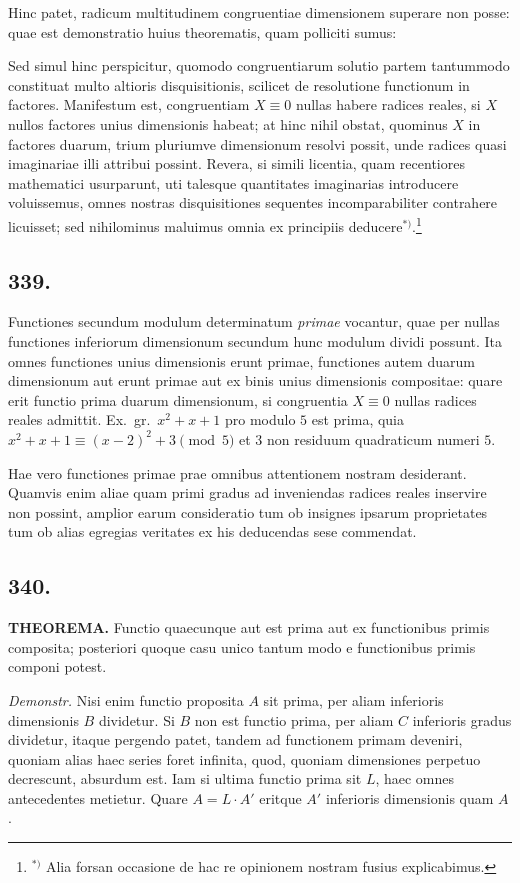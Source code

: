 \documentclass[12pt]{article}
\begin{document}
Hinc patet, radicum multitudinem congruentiae dimensionem superare non posse: quae est demonstratio huius theorematis, quam polliciti sumus:

Sed simul hinc perspicitur, quomodo congruentiarum solutio partem tantummodo constituat multo altioris disquisitionis, scilicet de resolutione functionum in factores. Manifestum est, congruentiam $X\equiv 0$ nullas habere radices reales, si $X$ nullos factores unius dimensionis habeat; at hinc nihil obstat, quominus $X$ in factores duarum, trium pluriumve dimensionum resolvi possit, unde radices quasi imaginariae illi attribui possint. Revera, si simili licentia, quam recentiores mathematici usurparunt, uti talesque quantitates imaginarias introducere voluissemus, omnes nostras disquisitiones sequentes incomparabiliter contrahere licuisset; sed nihilominus maluimus omnia ex principiis deducere$^{*)}$.\footnote{$^{*)}$ Alia forsan occasione de hac re opinionem nostram fusius explicabimus.}

\subsection*{339.}

Functiones secundum modulum determinatum \textit{primae} vocantur, quae per nullas functiones inferiorum dimensionum secundum hunc modulum dividi possunt. Ita omnes functiones unius dimensionis erunt primae, functiones autem duarum dimensionum aut erunt primae aut ex binis unius dimensionis compositae: quare erit functio prima duarum dimensionum, si congruentia $X\equiv 0$ nullas radices reales admittit. Ex.~gr.~$x^2+x+1$ pro modulo $5$ est prima, quia $x^2+x+1 \equiv (x-2)^2+3\pmod{5}$ et $3$ non residuum quadraticum numeri $5$.

Hae vero functiones primae prae omnibus attentionem nostram desiderant. Quamvis enim aliae quam primi gradus ad inveniendas radices reales inservire non possint, amplior earum consideratio tum ob insignes ipsarum proprietates tum ob alias egregias veritates ex his deducendas sese commendat.

\subsection*{340.}

\textbf{THEOREMA.} Functio quaecunque aut est prima aut ex functionibus primis composita; posteriori quoque casu unico tantum modo e functionibus primis componi potest.

\textit{Demonstr.} Nisi enim functio proposita $A$ sit prima, per aliam inferioris dimensionis $B$ dividetur. Si $B$ non est functio prima, per aliam $C$ inferioris gradus dividetur, itaque pergendo patet, tandem ad functionem primam deveniri, quoniam alias haec series foret infinita, quod, quoniam dimensiones perpetuo decrescunt, absurdum est. Iam si ultima functio prima sit $L$, haec omnes antecedentes metietur. Quare $A=L\cdot A'$ eritque $A'$ inferioris dimensionis quam $A$.
\end{document}
